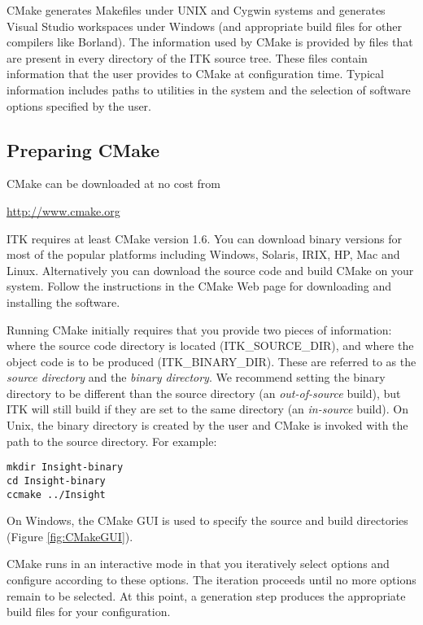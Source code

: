 CMake generates Makefiles under UNIX and Cygwin systems and generates Visual
Studio workspaces under Windows (and appropriate build files for other
compilers like Borland). The information used by CMake is provided by
 files that are present in every directory of the ITK
source tree. These files contain information that the user
provides to CMake at configuration time. Typical information includes paths
to utilities in the system and the selection of software options specified by
the user.

\subsection{Preparing CMake}
\label{sec:CMakeforITK}
 

CMake can be downloaded at no cost from 
\begin{center} 
  \url{http://www.cmake.org}
\end{center}

ITK requires at least CMake version 1.6. You can download binary
versions for most of the popular platforms including Windows, Solaris,
IRIX, HP, Mac and Linux. Alternatively you can download the source
code and build CMake on your system. Follow the instructions in the
CMake Web page for downloading and installing the software.

Running CMake initially requires that you provide two pieces of
information: where the source code directory is located
(ITK\_SOURCE\_DIR), and where the object code is to be produced
(ITK\_BINARY\_DIR). These are referred to as the \emph{source
directory} and the \emph{binary directory}. We recommend setting the
binary directory to be different than the source directory (an
\emph{out-of-source} build), but ITK will still build if they are set
to the same directory (an \emph{in-source} build).  On Unix, the
binary directory is created by the user and CMake is invoked with the
path to the source directory. For example:

\small
\begin{verbatim}
mkdir Insight-binary
cd Insight-binary
ccmake ../Insight
\end{verbatim}
\normalsize

On Windows, the CMake GUI is used to specify the source and build
directories (Figure \ref{fig:CMakeGUI}).

CMake runs in an interactive mode in that you iteratively select options and
configure according to these options. The iteration proceeds until no more
options remain to be selected. At this point, a generation step produces the appropriate
build files for your configuration.


